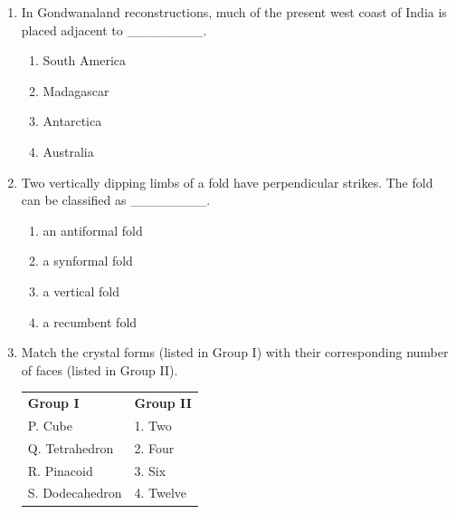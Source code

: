 \documentclass[journal,12pt,onecolumn]{IEEEtran}
\begin{document}
\begin{enumerate}
\begin{enumerate}
\begin{multicols}{2}
\begin{enumerate}
\item mid-oceanic ridge
\item subduction zone
\item sinistral transform fault
\item dextral transform fault
\end{enumerate}
\end{multicols}

\item In Gondwanaland reconstructions, much of the present west coast of India is placed adjacent to \_\_\_\_\_\_\_\_.

\hfill{}

\begin{multicols}{4}
\begin{enumerate}
\item South America
\item Madagascar
\item Antarctica
\item Australia
\end{enumerate}
\end{multicols}

\item Two vertically dipping limbs of a fold have perpendicular strikes. The fold can be classified as \_\_\_\_\_\_\_\_.

\hfill{}

\begin{multicols}{4}
\begin{enumerate}
\item an antiformal fold
\item a synformal fold
\item a vertical fold
\item a recumbent fold
\end{enumerate}
\end{multicols}

\item Match the crystal forms (listed in Group I) with their corresponding number of faces (listed in Group II).

\begin{tabular}{p{} p{}}
\textbf{Group I} & \textbf{Group II} \\
P. Cube & 1. Two \\
Q. Tetrahedron & 2. Four \\
R. Pinacoid & 3. Six \\
S. Dodecahedron & 4. Twelve \\
\end{tabular}


\end{enumerate}
\end{enumerate}
\end{document}
